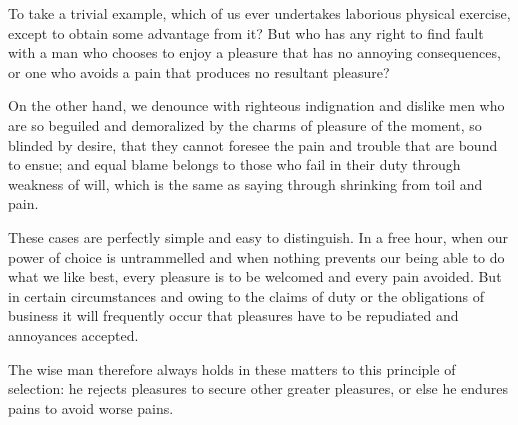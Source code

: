 To take a trivial example, which of us ever undertakes laborious physical exercise, except to obtain some advantage from it? But who has any right to find fault with a man who chooses to enjoy a pleasure that has no annoying consequences, or one who avoids a pain that produces no resultant pleasure?

On the other hand, we denounce with righteous indignation and dislike men who are so beguiled and demoralized by the charms of pleasure of the moment, so blinded by desire, that they cannot foresee the pain and trouble that are bound to ensue; and equal blame belongs to those who fail in their duty through weakness of will, which is the same as saying through shrinking from toil and pain.

These cases are perfectly simple and easy to distinguish. In a free hour, when our power of choice is untrammelled and when nothing prevents our being able to do what we like best, every pleasure is to be welcomed and every pain avoided. But in certain circumstances and owing to the claims of duty or the obligations of business it will frequently occur that pleasures have to be repudiated and annoyances accepted. 

The wise man therefore always holds in these matters to this principle of selection: he rejects pleasures to secure other greater pleasures, or else he endures pains to avoid worse pains.

\vfil\eject
